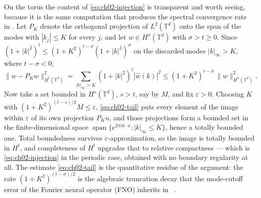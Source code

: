 On the torus the content of \eqref{eq:ch02-injection} is transparent and worth seeing, because it is the same computation that produces the spectral convergence rate in . Let $P_K$ denote the orthogonal projection of $L^2(\mathbb{T}^d)$ onto the span of the modes with $|k_j| \le K$ for every $j$, and let $w \in H^\sigma(\mathbb{T}^d)$ with $\sigma > t \ge 0$. Since $(1+|k|^2)^{t} \le (1+K^2)^{t-\sigma}(1+|k|^2)^{\sigma}$ on the discarded modes $|k|_\infty > K$, where $t - \sigma < 0$,
\begin{equation}
  \|w - P_K w\|_{H^t(\mathbb{T}^d)}^2
  = \sum_{|k|_\infty > K} (1+|k|^2)^{t} |\hat{w}(k)|^2
  \le (1+K^2)^{t-\sigma} \, \|w\|_{H^\sigma(\mathbb{T}^d)}^2 .
  \label{eq:ch02-tail}
\end{equation}
Now take a set bounded in $H^s(\mathbb{T}^d)$, $s > t$, say by $M$, and fix $\varepsilon > 0$. Choosing $K$ with $(1+K^2)^{(t-s)/2} M \le \varepsilon$, \eqref{eq:ch02-tail} puts every element of the image within $\varepsilon$ of its own projection $P_K u$, and those projections form a bounded set in the finite-dimensional space $\operatorname{span}\{e^{2\pi i k \cdot x} : |k|_\infty \le K\}$, hence a totally bounded one. Total boundedness survives $\varepsilon$-approximation, so the image is totally bounded in $H^t$, and completeness of $H^t$ upgrades that to relative compactness --- which is \eqref{eq:ch02-injection} in the periodic case, obtained with no boundary regularity at all. The estimate \eqref{eq:ch02-tail} is the quantitative residue of the argument: the rate $(1+K^2)^{(t-\sigma)/2}$ is the algebraic truncation decay that the mode-cutoff error of the Fourier neural operator (FNO) inherits in ~\cite{kovachki2021universal}.

